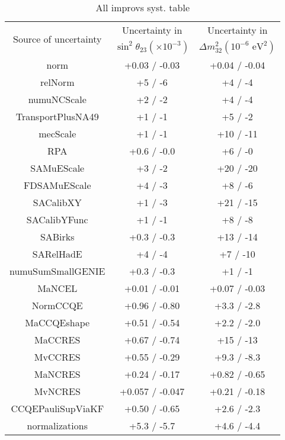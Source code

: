 
\begin{table*}[t]
  \centering
  \caption{
    All improvs syst. table
  }
  \begin{tabular}{c c c}
    \hline 
    \multirow{2}{*}{Source of uncertainty} & Uncertainty in & Uncertainty in \\
                                           & $\sin^2\!\theta_{23} (\times 10^{-3})$ & $\Delta m^2_{32} \left(10^{-6}\text{ eV}^{2}\right)$ \\
    \hline 
    norm& +0.03 / -0.03& +0.04 / -0.04 \\
    relNorm& +5 / -6 & +4 / -4 \\
    numuNCScale& +2 / -2& +4 / -4 \\
    TransportPlusNA49& +1 / -1& +5 / -2 \\
    mecScale& +1 / -1& +10 / -11 \\
    RPA& +0.6 / -0.0 & +6 / -0 \\
    SAMuEScale& +3 / -2& +20 / -20 \\
    FDSAMuEScale& +4 / -3& +8 / -6 \\
    SACalibXY& +1 / -3& +21 / -15 \\
    SACalibYFunc& +1 / -1& +8 / -8 \\
    SABirks& +0.3 / -0.3& +13 / -14 \\
    SARelHadE& +4 / -4& +7 / -10 \\
    numuSumSmallGENIE& +0.3 / -0.3& +1 / -1 \\
    MaNCEL& +0.01 / -0.01& +0.07 / -0.03 \\
    NormCCQE& +0.96 / -0.80& +3.3 / -2.8 \\
    MaCCQEshape& +0.51 / -0.54& +2.2 / -2.0 \\
    MaCCRES& +0.67 / -0.74& +15 / -13 \\
    MvCCRES& +0.55 / -0.29& +9.3 / -8.3 \\
    MaNCRES& +0.24 / -0.17& +0.82 / -0.65 \\
    MvNCRES& +0.057 / -0.047& +0.21 / -0.18 \\
    CCQEPauliSupViaKF& +0.50 / -0.65& +2.6 / -2.3 \\
    normalizations& +5.3 / -5.7& +4.6 / -4.4 \\
    \hline 
  \end{tabular}
  \label{tab:systShifts}
\end{table*}
